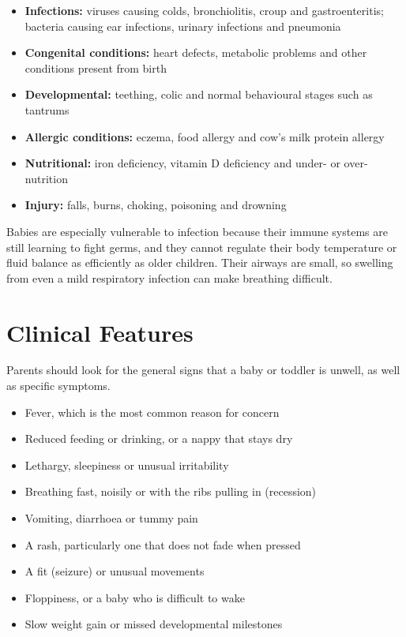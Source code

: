 \begin{itemize}
    \item \textbf{Infections:} viruses causing colds, bronchiolitis, croup and gastroenteritis; bacteria causing ear infections, urinary infections and pneumonia
    \item \textbf{Congenital conditions:} heart defects, metabolic problems and other conditions present from birth
    \item \textbf{Developmental:} teething, colic and normal behavioural stages such as tantrums
    \item \textbf{Allergic conditions:} eczema, food allergy and cow's milk protein allergy
    \item \textbf{Nutritional:} iron deficiency, vitamin D deficiency and under- or over-nutrition
    \item \textbf{Injury:} falls, burns, choking, poisoning and drowning
\end{itemize}

Babies are especially vulnerable to infection because their immune systems are still learning to fight germs, and they cannot regulate their body temperature or fluid balance as efficiently as older children. Their airways are small, so swelling from even a mild respiratory infection can make breathing difficult.

\section*{Clinical Features}
Parents should look for the general signs that a baby or toddler is unwell, as well as specific symptoms.

\begin{itemize}
    \item Fever, which is the most common reason for concern
    \item Reduced feeding or drinking, or a nappy that stays dry
    \item Lethargy, sleepiness or unusual irritability
    \item Breathing fast, noisily or with the ribs pulling in (recession)
    \item Vomiting, diarrhoea or tummy pain
    \item A rash, particularly one that does not fade when pressed
    \item A fit (seizure) or unusual movements
    \item Floppiness, or a baby who is difficult to wake
    \item Slow weight gain or missed developmental milestones
\end{itemize}

